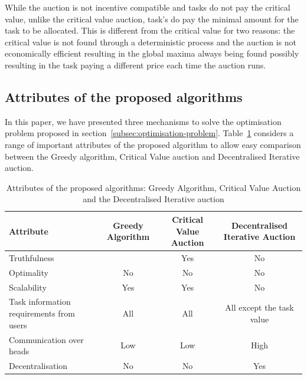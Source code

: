 While the auction is not incentive compatible and tasks do not pay the critical value, unlike the critical value
auction, task's do pay the minimal amount for the task to be allocated. This is different from the critical value for
two reasons: the critical value is not found through a deterministic process and the auction is not economically
efficient resulting in the global maxima always being found possibly resulting in the task paying a different price
each time the auction runs.

\subsection{Attributes of the proposed algorithms}
\label{subsec:attributes-of-proposed-algorithms}
In this paper, we have presented three mechanisms to solve the optimisation problem proposed in
section~\ref{subsec:optimisation-problem}. Table~\ref{tab:attributes_algorithms} considers a range of
important attributes of the proposed algorithm to allow easy comparison between the Greedy algorithm,
Critical Value auction and Decentralised Iterative auction.

\begin{table}[H]
    \begin{tabular}{|p{3cm}|c|c|c|}
        \hline
        \textbf{Attribute} & Greedy Algorithm & Critical Value Auction & Decentralised Iterative Auction \\ \hline
        Truthfulness & & Yes & No \\ \hline
        Optimality & No  & No & No \\ \hline
        Scalability & Yes & Yes & No \\ \hline
        Task information requirements from users & All & All & All except the task value \\ \hline
        Communication over heads & Low & Low & High \\ \hline
        Decentralisation & No  & No  & Yes \\ \hline
    \end{tabular}
    \caption{Attributes of the proposed algorithms: Greedy Algorithm, Critical Value Auction and the
    Decentralised Iterative auction}
    \label{tab:attributes_algorithms}
\end{table}
